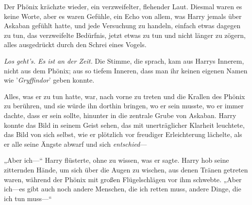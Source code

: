 Der Phönix krächzte wieder, ein verzweifelter, flehender Laut. Diesmal waren es keine Worte, aber es waren Gefühle, ein Echo von allem, was Harry jemals über Askaban gefühlt hatte, und jede Versuchung zu handeln, einfach etwas dagegen zu tun, das verzweifelte Bedürfnis, jetzt etwas zu tun und nicht länger zu zögern, alles ausgedrückt durch den Schrei eines Vogels.

\emph{Los geht's. Es ist an der Zeit.}
Die Stimme, die sprach, kam aus Harrys Innerem, nicht aus dem Phönix; aus so tiefem Inneren, dass man ihr keinen eigenen Namen wie '\emph{Gryffindor}' geben konnte.

Alles, was er zu tun hatte, war, nach vorne zu treten und die Krallen des Phönix zu berühren, und sie würde ihn dorthin bringen, wo er sein musste, wo er immer dachte, dass er sein sollte, hinunter in die zentrale Grube von Askaban. Harry konnte das Bild in seinem Geist sehen, das mit unerträglicher Klarheit leuchtete, das Bild von sich selbst, wie er plötzlich vor freudiger Erleichterung lächelte, als er alle seine Ängste abwarf und sich \emph{entschied}—

„Aber ich—“ Harry flüsterte, ohne zu wissen, was er sagte. Harry hob seine zitternden Hände, um sich über die Augen zu wischen, aus denen Tränen getreten waren, während der Phönix mit großen Flügelschlägen vor ihm schwebte.
„Aber ich—es gibt auch noch andere Menschen, die ich retten muss, andere Dinge, die ich tun muss—“

